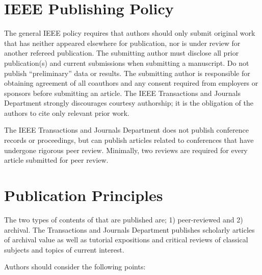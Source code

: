 \documentclass{ieeeojies}
\begin{document}
\section{IEEE Publishing Policy}
The general IEEE policy requires that authors should only submit original
work that has neither appeared elsewhere for publication, nor is under
review for another refereed publication. The submitting author must disclose
all prior publication(s) and current submissions when submitting a
manuscript. Do not publish ``preliminary'' data or results. The submitting
author is responsible for obtaining agreement of all coauthors and any
consent required from employers or sponsors before submitting an article.
The IEEE Transactions and Journals Department strongly discourages courtesy
authorship; it is the obligation of the authors to cite only relevant prior
work.

The IEEE Transactions and Journals Department does not publish conference
records or proceedings, but can publish articles related to conferences that
have undergone rigorous peer review. Minimally, two reviews are required for
every article submitted for peer review.

\section{Publication Principles}
The two types of contents of that are published are; 1) peer-reviewed and 2)
archival. The Transactions and Journals Department publishes scholarly
articles of archival value as well as tutorial expositions and critical
reviews of classical subjects and topics of current interest.

Authors should consider the following points:
\end{document}
